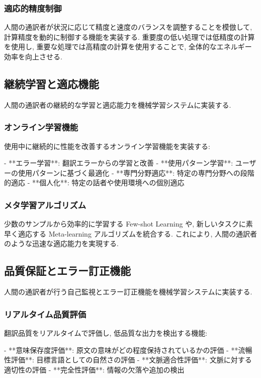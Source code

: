 \subsubsection{適応的精度制御}

人間の通訳者が状況に応じて精度と速度のバランスを調整することを模倣して, 計算精度を動的に制御する機能を実装する.
重要度の低い処理では低精度の計算を使用し, 重要な処理では高精度の計算を使用することで, 全体的なエネルギー効率を向上させる.

\subsection{継続学習と適応機能}

人間の通訳者の継続的な学習と適応能力を機械学習システムに実装する.

\subsubsection{オンライン学習機能}

使用中に継続的に性能を改善するオンライン学習機能を実装する:

- **エラー学習**: 翻訳エラーからの学習と改善
- **使用パターン学習**: ユーザーの使用パターンに基づく最適化  
- **専門分野適応**: 特定の専門分野への段階的適応
- **個人化**: 特定の話者や使用環境への個別適応

\subsubsection{メタ学習アルゴリズム}

少数のサンプルから効率的に学習する Few-shot Learning や, 新しいタスクに素早く適応する Meta-learning アルゴリズムを統合する.
これにより, 人間の通訳者のような迅速な適応能力を実現する.

\subsection{品質保証とエラー訂正機能}

人間の通訳者が行う自己監視とエラー訂正機能を機械学習システムに実装する.

\subsubsection{リアルタイム品質評価}

翻訳品質をリアルタイムで評価し, 低品質な出力を検出する機能:

- **意味保存度評価**: 原文の意味がどの程度保持されているかの評価
- **流暢性評価**: 目標言語としての自然さの評価  
- **文脈適合性評価**: 文脈に対する適切性の評価
- **完全性評価**: 情報の欠落や追加の検出

